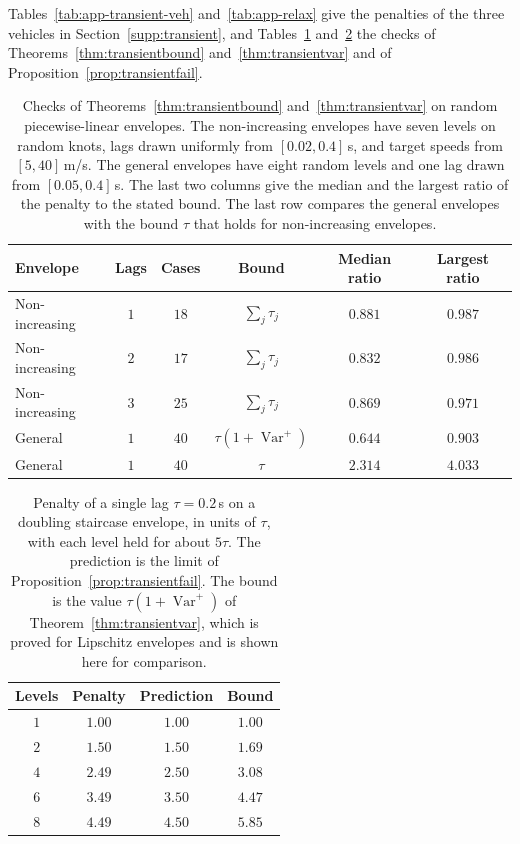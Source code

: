 \documentclass[12pt, twoside]{amsart}
\theoremstyle{definition}
\begin{document}
Tables~\ref{tab:app-transient-veh} and~\ref{tab:app-relax} give the penalties of the three vehicles
in Section~\ref{supp:transient}, and Tables~\ref{tab:app-transient} and~\ref{tab:app-staircase} the
checks of Theorems~\ref{thm:transientbound} and~\ref{thm:transientvar} and of
Proposition~\ref{prop:transientfail}.

\begin{table}[htbp]
\centering\small
\caption{Checks of Theorems~\ref{thm:transientbound} and~\ref{thm:transientvar} on random piecewise-linear envelopes. The non-increasing envelopes have seven levels on random knots, lags drawn uniformly from $[0.02,0.4]$\,s, and target speeds from $[5,40]$\,m/s. The general envelopes have eight random levels and one lag drawn from $[0.05,0.4]$\,s. The last two columns give the median and the largest ratio of the penalty to the stated bound. The last row compares the general envelopes with the bound $\tau$ that holds for non-increasing envelopes.}\label{tab:app-transient}
\begin{tabular}{lccccc}
\toprule
Envelope & Lags & Cases & Bound & Median ratio & Largest ratio\\
\midrule
Non-increasing & $1$ & $18$ & $\sum_j\tau_j$ & $0.881$ & $0.987$\\
Non-increasing & $2$ & $17$ & $\sum_j\tau_j$ & $0.832$ & $0.986$\\
Non-increasing & $3$ & $25$ & $\sum_j\tau_j$ & $0.869$ & $0.971$\\
General & $1$ & $40$ & $\tau(1+\operatorname{Var}^+)$ & $0.644$ & $0.903$\\
General & $1$ & $40$ & $\tau$ & $2.314$ & $4.033$\\
\bottomrule
\end{tabular}
\end{table}

\begin{table}[htbp]
\centering\small
\caption{Penalty of a single lag $\tau=0.2$\,s on a doubling staircase envelope, in units of $\tau$, with each level held for about $5\tau$. The prediction is the limit of Proposition~\ref{prop:transientfail}. The bound is the value $\tau(1+\operatorname{Var}^+)$ of Theorem~\ref{thm:transientvar}, which is proved for Lipschitz envelopes and is shown here for comparison.}\label{tab:app-staircase}
\begin{tabular}{cccc}
\toprule
Levels & Penalty & Prediction & Bound\\
\midrule
$1$ & $1.00$ & $1.00$ & $1.00$\\
$2$ & $1.50$ & $1.50$ & $1.69$\\
$4$ & $2.49$ & $2.50$ & $3.08$\\
$6$ & $3.49$ & $3.50$ & $4.47$\\
$8$ & $4.49$ & $4.50$ & $5.85$\\
\bottomrule
\end{tabular}
\end{table}
\end{document}
